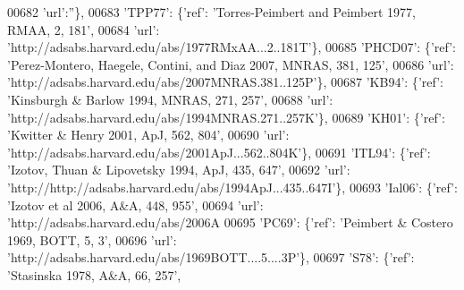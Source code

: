 \begin{DoxyCode}
00682                                        \textcolor{stringliteral}{'url'}:\textcolor{stringliteral}{''}\},
00683                              \textcolor{stringliteral}{'TPP77'}: \{\textcolor{stringliteral}{'ref'}: \textcolor{stringliteral}{'Torres-Peimbert and Peimbert 1977, RMAA, 2, 181'},
00684                                        \textcolor{stringliteral}{'url'}: \textcolor{stringliteral}{'http://adsabs.harvard.edu/abs/1977RMxAA...2..181T'}\},
00685                              \textcolor{stringliteral}{'PHCD07'}: \{\textcolor{stringliteral}{'ref'}: \textcolor{stringliteral}{'Perez-Montero, Haegele, Contini, and Diaz 2007, MNRAS, 381,
       125'},
00686                                         \textcolor{stringliteral}{'url'}: \textcolor{stringliteral}{'http://adsabs.harvard.edu/abs/2007MNRAS.381..125P'}\},
00687                              \textcolor{stringliteral}{'KB94'}: \{\textcolor{stringliteral}{'ref'}: \textcolor{stringliteral}{'Kinsburgh & Barlow 1994, MNRAS, 271, 257'},
00688                                       \textcolor{stringliteral}{'url'}: \textcolor{stringliteral}{'http://adsabs.harvard.edu/abs/1994MNRAS.271..257K'}\},
00689                              \textcolor{stringliteral}{'KH01'}: \{\textcolor{stringliteral}{'ref'}: \textcolor{stringliteral}{'Kwitter & Henry 2001, ApJ, 562, 804'},
00690                                       \textcolor{stringliteral}{'url'}: \textcolor{stringliteral}{'http://adsabs.harvard.edu/abs/2001ApJ...562..804K'}\},
00691                              \textcolor{stringliteral}{'ITL94'}: \{\textcolor{stringliteral}{'ref'}: \textcolor{stringliteral}{'Izotov, Thuan & Lipovetsky 1994, ApJ, 435, 647'},
00692                                        \textcolor{stringliteral}{'url'}: \textcolor{stringliteral}{'http://http://adsabs.harvard.edu/abs/1994ApJ...435..647I'}\},
00693                              \textcolor{stringliteral}{'Ial06'}: \{\textcolor{stringliteral}{'ref'}: \textcolor{stringliteral}{'Izotov et al 2006, A&A, 448, 955'},
00694                                        \textcolor{stringliteral}{'url'}: \textcolor{stringliteral}{'http://adsabs.harvard.edu/abs/2006A%
00695                              \textcolor{stringliteral}{'PC69'}: \{\textcolor{stringliteral}{'ref'}: \textcolor{stringliteral}{'Peimbert & Costero 1969, BOTT, 5, 3'},
00696                                       \textcolor{stringliteral}{'url'}: \textcolor{stringliteral}{'http://adsabs.harvard.edu/abs/1969BOTT....5....3P'}\},
00697                              \textcolor{stringliteral}{'S78'}: \{\textcolor{stringliteral}{'ref'}: \textcolor{stringliteral}{'Stasinska 1978, A&A, 66, 257'},
}
\end{DoxyCode}
